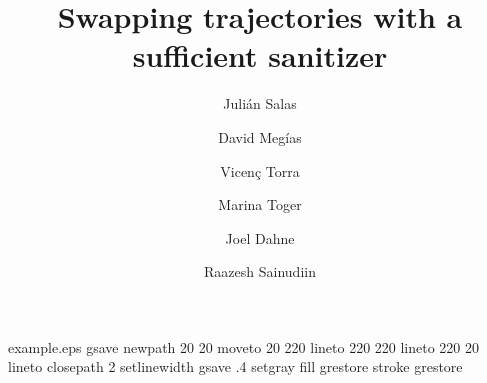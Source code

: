 %
%
%
%
%
\begin{filecontents*}{example.eps}
gsave
newpath
  20 20 moveto
  20 220 lineto
  220 220 lineto
  220 20 lineto
closepath
2 setlinewidth
gsave
  .4 setgray fill
grestore
stroke
grestore
\end{filecontents*}
%
\RequirePackage{fix-cm}
%
\documentclass[smallextended]{svjour3}       %
%
\smartqed  %
%
\usepackage{graphicx}

\usepackage[ruled]{algorithm2e}
\usepackage{subfig}
\usepackage{url}
\usepackage{amsmath,amssymb}
\usepackage[colorlinks]{hyperref}
\usepackage{blindtext,graphicx}
\usepackage{multirow}
\usepackage[utf8]{inputenc}
\usepackage{natbib}

\setlength{\tabcolsep}{13pt}

\newcommand{\comment}[1]{ {\bfseries \color{blue} #1 }} %


\title{Swapping trajectories with a sufficient sanitizer
}

\author{Juli\'an Salas \and 
		David Meg\'ias \and
		Vicen\c{c} Torra \and 
		Marina Toger \and 
		Joel Dahne \and 
		Raazesh Sainudiin
		}



